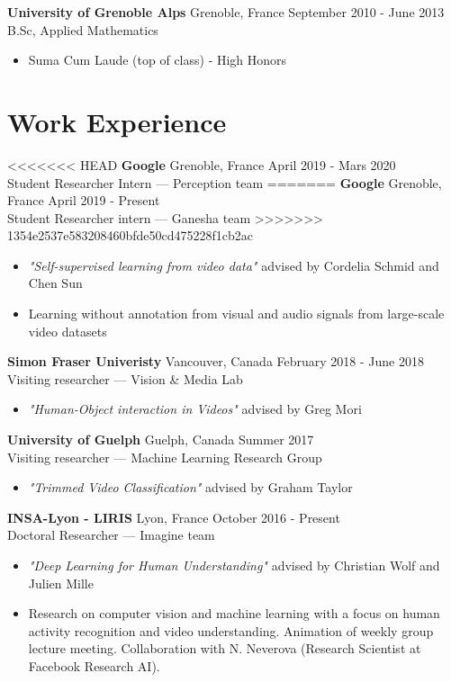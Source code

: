 \documentclass[10pt]{res} %
\begin{document}
\begin{resume}
\textbf{University of Grenoble Alps} \hfill Grenoble, France \hfill September 2010 - June 2013 \\
B.Sc, Applied Mathematics
\begin{itemize}
\item Suma Cum Laude (top of class) - High Honors
\end{itemize}
 

\section{\large Work Experience} 

<<<<<<< HEAD
\textbf{Google} \hfill Grenoble, France \hfill April 2019 - Mars 2020 \\
Student Researcher Intern --- Perception team
=======
\textbf{Google} \hfill Grenoble, France \hfill April 2019 - Present \\
Student Researcher intern --- Ganesha team
>>>>>>> 1354e2537e583208460bfde50cd475228f1cb2ac
\begin{itemize}
\item \textit{"Self-supervised learning from video data"} advised by Cordelia Schmid and Chen Sun
\item Learning without annotation from visual and audio signals from large-scale video datasets
\end{itemize}

\textbf{Simon Fraser Univeristy} \hfill Vancouver, Canada \hfill February 2018 - June 2018 \\
Visiting researcher --- Vision \& Media Lab
\begin{itemize}
\item \textit{"Human-Object interaction in Videos"} advised by Greg Mori
\end{itemize}

\textbf{University of Guelph} \hfill Guelph, Canada \hfill Summer 2017 \\
Visiting researcher --- Machine Learning Research Group
\begin{itemize}
\item \textit{"Trimmed Video Classification"} advised by Graham Taylor
\end{itemize}

\textbf{INSA-Lyon - LIRIS} \hfill Lyon, France \hfill October 2016 - Present \\
Doctoral Researcher --- Imagine team
\begin{itemize}
\item \textit{"Deep Learning for Human Understanding"} advised by Christian Wolf and Julien Mille
\item Research on computer vision and machine learning with a focus on human activity recognition and video understanding. Animation of weekly group lecture meeting. Collaboration with N. Neverova (Research Scientist at Facebook Research AI).
\end{itemize}


\end{resume}
\end{document}
